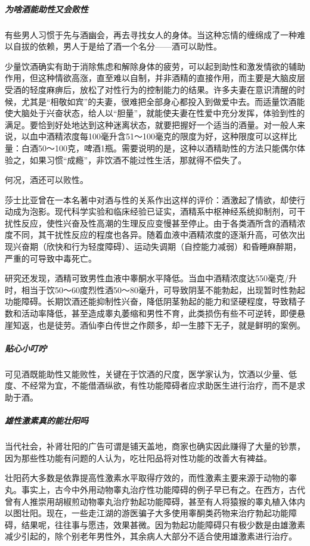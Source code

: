 \subparagraph{为啥酒能助性又会败性}

有些男人习惯于先与酒幽会，再去寻找女人的身体。当这种忘情的缠绵成了一种难以自拔的依赖，男人于是给了酒一个名分——酒可以助性。

少量饮酒确实有助于消除焦虑和解除身体的疲劳，可以起到助性和激发情欲的辅助作用，但这种情欲高涨，直至难以自制，并非酒精的直接作用，而主要是大脑皮层受酒的轻度麻痹后，放松了对性行为的控制能力的结果。许多夫妻在意识清醒的时候，尤其是“相敬如宾”的夫妻，很难把全部身心都投入到做爱中去。而适量饮酒能使大脑处于兴奋状态，给人以“胆量”，就能使夫妻在性爱中充分发挥，体验到性的满足。要恰到好处地达到这种迷离状态，就要把握好一个适当的酒量。对一般人来说，以血中酒精浓度每100毫升含51～100毫克的限度为好，这种限度可以这样比量：白酒50～100克，啤酒1瓶。需要说明的是，这种以酒精助性的方法只能偶尔体验之，如果习惯“成瘾”，非饮酒不能过性生活，那就得不偿失了。

何况，酒还可以败性。

莎士比亚曾在一本名著中对酒与性的关系作出这样的评价：酒激起了情欲，却使行动成为泡影。现代科学实验和临床经验已证实，酒精系中枢神经系统抑制剂，可干扰性反应，使性兴奋及性高潮的生理反应变慢甚至停止。由于各类酒所含的酒精浓度不同，其干扰性反应的程度也各异。随着血液中酒精浓度的逐渐升高，可依次出现兴奋期（欣快和行为轻度障碍）、运动失调期（自控能力减弱）和昏睡麻醉期，严重的可导致中毒死亡。

研究还发现，酒精可致男性血液中睾酮水平降低。当血中酒精浓度达550毫克/升时，相当于饮50～60度烈性酒50～80毫升，可导致阴茎不能勃起，出现暂时性勃起功能障碍。长期饮酒还能抑制性兴奋，降低阴茎勃起的能力和坚硬程度，导致精子数和活动率降低，甚至造成睾丸萎缩和男性不育，此类损伤有些不可逆转，即便悬崖知返，也是徒劳。酒仙李白传世之作颇多，却一生膝下无子，就是鲜明的案例。

\subparagraph{贴心小叮咛}

可见酒既能助性又能败性，关键在于饮酒的尺度，医学家认为，饮酒以少量、低度、不经常为宜，不能借酒纵欲，有性功能障碍者应求助医生进行治疗，而不是求助于酒。

\subparagraph{雄性激素真的能壮阳吗}

当代社会，补肾壮阳的广告可谓是铺天盖地，商家也确实因此赚得了大量的钞票，因为那些性功能有问题的人认为，吃壮阳品将对性功能的改善大有裨益。

壮阳药大多数是依靠提高性激素水平取得疗效的，而性激素主要来源于动物的睾丸。事实上，古今中外用动物睾丸治疗性功能障碍的例子早已有之。在西方，古代曾有人推崇用胡椒煎动物睾丸治疗勃起功能障碍，甚至有人将猿猴的睾丸植入体内以图壮阳。现在，一些走江湖的游医骗子大多使用睾酮类药物来治疗勃起功能障碍，结果呢，往往事与愿违，效果甚微。因为勃起功能障碍只有极少数是由雄激素减少引起的，除个别老年男性外，其余病人大部分不适合使用雄激素进行治疗。

